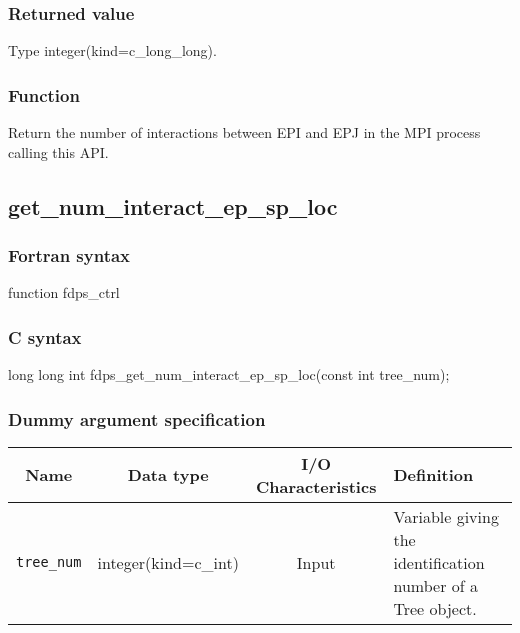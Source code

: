 \subsubsection*{Returned value}
Type integer(kind=c\_long\_long).

\subsubsection*{Function}
Return the number of interactions between EPI and EPJ in the MPI process calling this API.
\clearpage

\subsection{get\_num\_interact\_ep\_sp\_loc}
\subsubsection*{Fortran syntax}
\begin{screen}
\begin{spverbatim}
function fdps_ctrl%
\end{spverbatim}
\end{screen}

\subsubsection*{C syntax}
\begin{screen}
\begin{spverbatim}
long long int fdps_get_num_interact_ep_sp_loc(const int tree_num); 
\end{spverbatim}
\end{screen}

\subsubsection*{Dummy argument specification}
\begin{table}[h]
\begin{tabularx}{\linewidth}{cccX}
\toprule
\rowcolor{Snow2}
Name & Data type & I/O Characteristics & Definition \\
\midrule
\verb|tree_num|  & integer(kind=c\_int) & Input & Variable giving the identification number of a Tree object. \\
\bottomrule
\end{tabularx}
\end{table}

